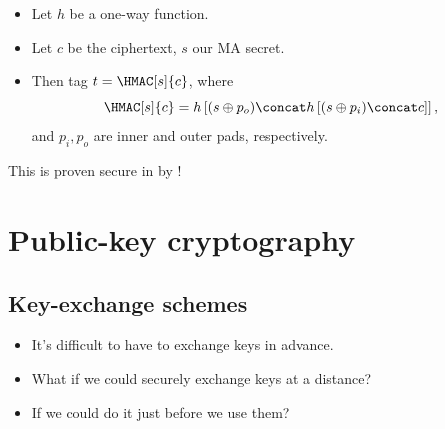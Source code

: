 \begin{frame}
  \begin{solution}
    \begin{itemize}
      \item Let \(h\) be a one-way function.
      \item Let \(c\) be the ciphertext, \(s\) our \ac{MA} secret.

        \pause{}

      \item Then tag \(t = \HMAC[s]{c}\), where \[
          \HMAC[s]{c} = h\left[
            (s\oplus p_o)\concat h\left[ (s\oplus p_i)\concat c \right]
          \right],
        \] and \(p_i, p_o\) are inner and outer pads, respectively.
    \end{itemize}
  \end{solution}

  \pause{}

  \begin{remark}
    This is proven secure in by \textcite{HMAC}!
  \end{remark}
\end{frame}


\section{Public-key cryptography}

\subsection{Key-exchange schemes}

\begin{frame}
  \begin{idea}
    \begin{itemize}
      \item It's difficult to have to exchange keys in advance.

        \pause{}

      \item What if we could securely exchange keys at a distance?
      \item If we could do it just before we use them?
    \end{itemize}
  \end{idea}

%
\end{frame}

